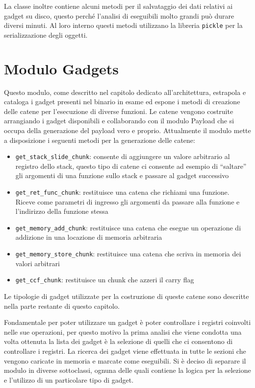 La classe inoltre contiene alcuni metodi per il salvataggio dei dati
relativi ai gadget su disco, questo perché l'analisi di eseguibili
molto grandi può durare diversi minuti. Al loro interno questi metodi
utilizzano la libreria \lstinline{pickle} per la serializzazione degli
oggetti. 

\section{Modulo Gadgets}

Questo modulo, come descritto nel capitolo dedicato all'architettura,
estrapola e cataloga i gadget presenti nel binario in esame ed espone
i metodi di creazione delle catene per l'esecuzione di diverse
funzioni. Le catene vengono costruite arrangiando i gadget disponibili
e collaborando con il modulo Payload che si occupa della generazione
del payload vero e proprio. Attualmente il modulo mette a disposizione
i seguenti metodi per la generazione delle catene:
\begin{itemize}
  \item \lstinline{get_stack_slide_chunk}: consente di aggiungere un
    valore arbitrario al registro dello stack, questo tipo di catene
    ci consente ad esempio di ``saltare'' gli argomenti di una
    funzione sullo stack e passare al gadget successivo
  \item \lstinline{get_ret_func_chunk}: restituisce una catena che
    richiami una funzione. Riceve come parametri di ingresso gli
    argomenti da passare alla funzione e l'indirizzo della funzione
    stessa 
  \item \lstinline{get_memory_add_chunk}: restituisce una catena che
    esegue un operazione di addizione in una locazione di memoria
    arbitraria
  \item \lstinline{get_memory_store_chunk}: restituisce una catena che
    scriva in memoria dei valori arbitrari
  \item \lstinline{get_ccf_chunk}: restituisce un chunk che azzeri il
    carry flag
\end{itemize}

Le tipologie di gadget utilizzate per la costruzione di queste catene
sono descritte nella parte restante di questo capitolo. 

Fondamentale per poter utilizzare un gadget è poter controllare i
registri coinvolti nelle sue operazioni, per questo motivo la prima
analisi che viene condotta una volta ottenuta la lista dei gadget è la
selezione di quelli che ci consentono di controllare i registri. La
ricerca dei gadget viene effettuata in tutte le sezioni che vengono
caricate in memoria e marcate come eseguibili. Si è deciso di separare
il modulo in diverse sottoclassi, ognuna delle quali contiene la
logica per la selezione e l'utilizzo di un particolare tipo di gadget.

